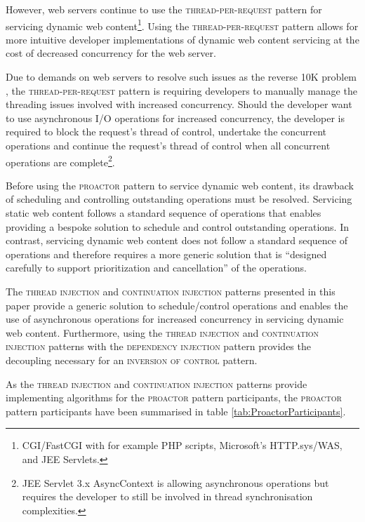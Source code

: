 \documentclass[prodmode]{style/acmlarge}
\begin{document}
However, web servers continue to use the \textsc{thread-per-request} pattern for
servicing dynamic web content\footnote{CGI/FastCGI with for example PHP scripts,
Microsoft's HTTP.sys/WAS, and JEE Servlets.}.  Using the
\textsc{thread-per-request} pattern allows for more intuitive developer
implementations of dynamic web content servicing at the cost of decreased
concurrency for the web server.

Due to demands on web servers to resolve such issues as the reverse 10K problem
\cite{reverse-ten-k-problem}, the \textsc{thread-per-request} pattern is
requiring developers to manually manage the threading issues involved with
increased concurrency.  Should the developer want to use asynchronous I/O
operations for increased concurrency, the developer is required to block the
request's thread of control, undertake the concurrent operations and continue
the request's thread of control when all concurrent operations are
complete\footnote{JEE Servlet 3.x AsyncContext is allowing asynchronous
operations but requires the developer to still be involved in thread
synchronisation complexities.}.

Before using the \textsc{proactor} pattern to service dynamic web content, its
drawback of scheduling and controlling outstanding operations \cite[p.
8]{proactor} must be resolved.  Servicing static web content follows a standard
sequence of operations that enables providing a bespoke solution to schedule and
control outstanding operations.  In contrast, servicing dynamic web content does
not follow a standard sequence of operations and therefore requires a more
generic solution that is ``designed carefully to support prioritization and
cancellation'' \cite[p. 8]{proactor} of the operations.

The \textsc{thread injection} and \textsc{continuation injection} patterns
presented in this paper provide a generic solution to schedule/control
operations and enables the use of asynchronous operations for increased
concurrency in servicing dynamic web content.  Furthermore, using the
\textsc{thread injection} and \textsc{continuation injection} patterns with the
\textsc{dependency injection} pattern \cite{ioc} provides the decoupling
necessary for an \textsc{inversion of control} pattern.

As the \textsc{thread injection} and \textsc{continuation injection} patterns
provide implementing algorithms for the \textsc{proactor} pattern participants,
the \textsc{proactor} pattern participants have been summarised in table
\ref{tab:ProactorParticipants}.
\end{document}
